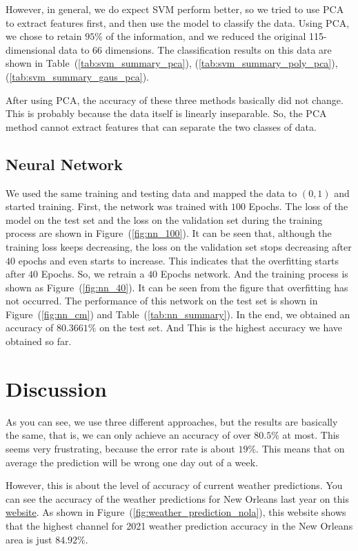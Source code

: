 \documentclass[11pt, a4paper, jou]{apa7}
\begin{document}
    However, in general, we do expect SVM perform better, so we tried to use PCA to extract features first, and then use the model to classify the data. Using PCA, we chose to retain $95\%$ of the information, and we reduced the original 115-dimensional data to 66 dimensions. The classification results on this data are shown in Table~(\ref{tab:svm_summary_pca}), (\ref{tab:svm_summary_poly_pca}), (\ref{tab:svm_summary_gaus_pca}). 

    After using PCA, the accuracy of these three methods basically did not change. This is probably because the data itself is linearly inseparable. So, the PCA method cannot extract features that can separate the two classes of data. 

\subsection{Neural Network}
We used the same training and testing data and mapped the data to $(0,1)$ and started training. First, the network was trained with $100$ Epochs. The loss of the model on the test set and the loss on the validation set during the training process are shown in Figure~(\ref{fig:nn_100}). It can be seen that, although the training loss keeps decreasing, the loss on the validation set stops decreasing after $40$ epochs and even starts to increase. This indicates that the overfitting starts after $40$ Epochs. So, we retrain a $40$ Epochs network. And the training process is shown as Figure~(\ref{fig:nn_40}). It can be seen from the figure that overfitting has not occurred. The performance of this network on the test set is shown in Figure~(\ref{fig:nn_cm}) and Table~(\ref{tab:nn_summary}). In the end, we obtained an accuracy of $80.3661\%$ on the test set. And This is the highest accuracy we have obtained so far.

\section{Discussion}

As you can see, we use three different approaches, but the results are basically the same, that is, we can only achieve an accuracy of over $80.5\%$ at most. This seems very frustrating, because the error rate is about $19\%$. This means that on average the prediction will be wrong one day out of a week. 

However, this is about the level of accuracy of current weather predictions. You can see the accuracy of the weather predictions for New Orleans last year on this \href{https://www.forecastadvisor.com/Louisiana/NewOrleans/70112/}{website}. As shown in Figure~(\ref{fig:weather_prediction_nola}), this website shows that the highest channel for 2021 weather prediction accuracy in the New Orleans area is just $84.92\%$. 
\end{document}
